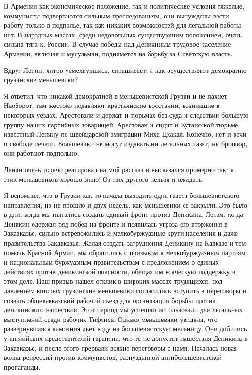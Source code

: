 \documentclass[12pt, a4paper, openany]{book}
\begin{document}
В Армении как экономическое положение, так и политические условия тяжелые, коммунисты подвергаются сильным преследованиям, они вынуждены вести работу только в подполье, так как никаких возможностей для легальной работы нет. В народных массах, среди недовольных существующим положением, очень сильна тяга к. России. В случае победы над Деникиным трудовое население Армении, включая и мусульман, поднимется на борьбу за Советскую власть.

Вдруг Ленин, хитро усмехнувшись, спрашивает: а как осуществляют демократию грузинские меньшевики?

Я ответил, что никакой демократией в меньшевистской Грузии и не пахнет Наоборот, там жестоко подавляют крестьянские восстании, возникшие в некоторых уездах. Арестовали и держат и тюрьмах без суда и следствии большую группу наших партийных товарищей. Арестован и сидит и Кутаисской тюрьме известный Ленину по швейцарской эмиграции Миха Цхакая. Конечно, нет и речи о свободе печати. Большевики не могут издавать ни легальных газет, ни брошюр, они работают подпольно.

Ленин очень горячо реагировал на мой рассказ и высказался примерно так: я этих меньшевиков хорошо знаю! От них другого нельзя и ожидать.

Я вспомнил, что в Грузии как-то начала выходить одна газета большевистского направления, но не прошло и двух недель, как меньшевики ее закрыли. Это было в дни, когда мы пытались создать единый фронт против Деникина. Летом, когда Деникин одержал ряд побед на фронте и появилась угроза его вторжения в Закавказье, сильно встревожились и мелкобуржуазные круги населения и даже правительства Закавказья. Желая создать затруднения Деникину на Кавказе и тем помочь Красной Армии, мы обратились с призывом к мелкобуржуазным партиям и национальным буржуазным правительствам с предложением о единых действиях против деникинской опасности, обещая им всяческую поддержку в этом деле. Наш призыв нашел отклик в широких массах трудящихся, под давлением которых грузинские меньшевики согласились вступить в переговоры и созвать общекавказский рабочий съезд для организации борьбы против деникинского нашествия. Этот период мы успешно использовали для легальных выступлений среди рабочих Тифлиса. Однако меньшевики увидели, что развернувшаяся кампания льет воду на большевистскую мельницу. Они добились у английских представителей гарантии, что те не допустят нашествия Деникина в Закавказье, и после этого прервали всякие переговоры с нами. Началась новая волна репрессий против коммунистов, разнузданной антибольшевистской пропаганды.
\end{document}
